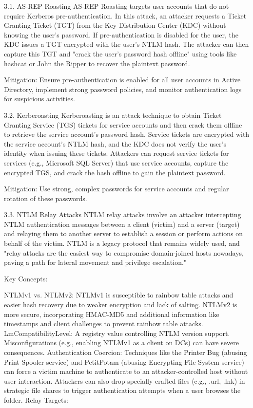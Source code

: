 3.1. AS-REP Roasting
AS-REP Roasting targets user accounts that do not require Kerberos pre-authentication. In this attack, an attacker requests a Ticket Granting Ticket (TGT) from the Key Distribution Center (KDC) without knowing the user's password. If pre-authentication is disabled for the user, the KDC issues a TGT encrypted with the user's NTLM hash. The attacker can then capture this TGT and "crack the user's password hash offline" using tools like hashcat or John the Ripper to recover the plaintext password.

Mitigation: Ensure pre-authentication is enabled for all user accounts in Active Directory, implement strong password policies, and monitor authentication logs for suspicious activities.

3.2. Kerberoasting
Kerberoasting is an attack technique to obtain Ticket Granting Service (TGS) tickets for service accounts and then crack them offline to retrieve the service account's password hash. Service tickets are encrypted with the service account's NTLM hash, and the KDC does not verify the user's identity when issuing these tickets. Attackers can request service tickets for services (e.g., Microsoft SQL Server) that use service accounts, capture the encrypted TGS, and crack the hash offline to gain the plaintext password.

Mitigation: Use strong, complex passwords for service accounts and regular rotation of these passwords.

3.3. NTLM Relay Attacks
NTLM relay attacks involve an attacker intercepting NTLM authentication messages between a client (victim) and a server (target) and relaying them to another server to establish a session or perform actions on behalf of the victim. NTLM is a legacy protocol that remains widely used, and "relay attacks are the easiest way to compromise domain-joined hosts nowadays, paving a path for lateral movement and privilege escalation."

Key Concepts:

NTLMv1 vs. NTLMv2: NTLMv1 is susceptible to rainbow table attacks and easier hash recovery due to weaker encryption and lack of salting. NTLMv2 is more secure, incorporating HMAC-MD5 and additional information like timestamps and client challenges to prevent rainbow table attacks.
LmCompatibilityLevel: A registry value controlling NTLM version support. Misconfigurations (e.g., enabling NTLMv1 as a client on DCs) can have severe consequences.
Authentication Coercion: Techniques like the Printer Bug (abusing Print Spooler service) and PetitPotam (abusing Encrypting File System service) can force a victim machine to authenticate to an attacker-controlled host without user interaction. Attackers can also drop specially crafted files (e.g., .url, .lnk) in strategic file shares to trigger authentication attempts when a user browses the folder.
Relay Targets:

